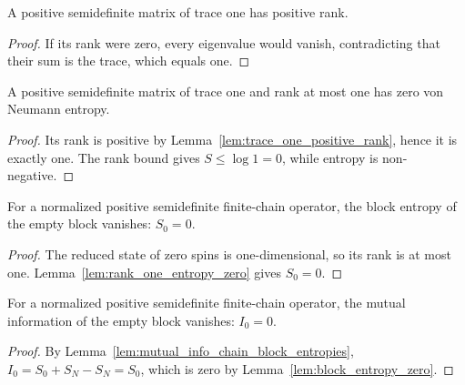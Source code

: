 \begin{lemma}
    \label{lem:trace_one_positive_rank}
    \leanok
    A positive semidefinite matrix of trace one has positive rank.
\end{lemma}
\begin{proof}\leanok
    If its rank were zero, every eigenvalue would vanish, contradicting that
    their sum is the trace, which equals one.
\end{proof}

\begin{lemma}
    \label{lem:rank_one_entropy_zero}
    \leanok
    A positive semidefinite matrix of trace one and rank at most one has zero
    von Neumann entropy.
\end{lemma}
\begin{proof}\leanok
    Its rank is positive by Lemma~\ref{lem:trace_one_positive_rank}, hence it is
    exactly one. The rank bound gives $S\le\log 1=0$, while entropy is
    non-negative.
\end{proof}

\begin{lemma}
    \label{lem:block_entropy_zero}
    \leanok
    For a normalized positive semidefinite finite-chain operator, the block entropy of
    the empty block vanishes: $S_0=0$.
\end{lemma}
\begin{proof}\leanok
    The reduced state of zero spins is one-dimensional, so its rank is at most
    one. Lemma~\ref{lem:rank_one_entropy_zero} gives $S_0=0$.
\end{proof}

\begin{lemma}
    \label{lem:mutual_info_chain_zero}
    \leanok
    For a normalized positive semidefinite finite-chain operator, the mutual information
    of the empty block vanishes: $I_0=0$.
\end{lemma}
\begin{proof}\leanok
    By Lemma~\ref{lem:mutual_info_chain_block_entropies},
    $I_0=S_0+S_N-S_N=S_0$, which is zero by
    Lemma~\ref{lem:block_entropy_zero}.
\end{proof}

